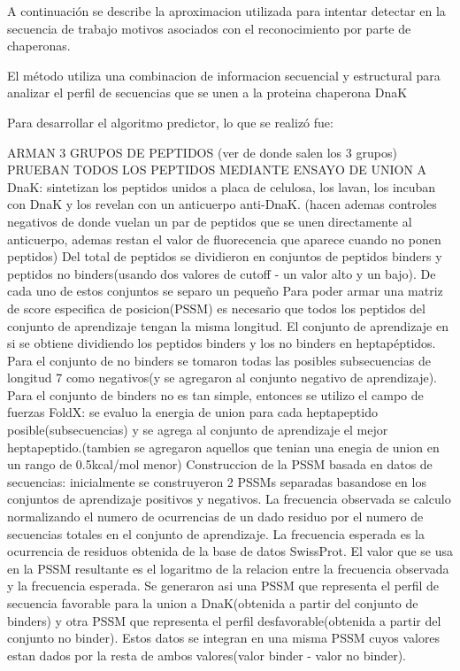 A continuación se describe la aproximacion utilizada para intentar detectar en la secuencia de trabajo motivos asociados con el reconocimiento por parte de chaperonas.

El método utiliza una combinacion de informacion secuencial y estructural para analizar el perfil de secuencias que se unen a la proteina chaperona DnaK

Para desarrollar el algoritmo predictor, lo que se realizó fue:

ARMAN 3 GRUPOS DE PEPTIDOS (ver de donde salen los 3 grupos)
PRUEBAN TODOS LOS PEPTIDOS MEDIANTE ENSAYO DE UNION A DnaK: sintetizan los peptidos unidos a placa de celulosa, los lavan, los incuban con DnaK y los revelan con un anticuerpo anti-DnaK. (hacen ademas controles negativos de donde vuelan un par de peptidos que se unen directamente al anticuerpo, ademas restan el valor de fluorecencia que aparece cuando no ponen peptidos)
Del total de peptidos se dividieron en conjuntos de peptidos binders y peptidos no binders(usando dos valores de cutoff - un valor alto y un bajo). De cada uno de estos conjuntos se separo un pequeño %
Para poder armar una matriz de score especifica de posicion(PSSM) es necesario que todos los peptidos del conjunto de aprendizaje tengan la misma longitud. El conjunto de aprendizaje en si se obtiene dividiendo los peptidos binders y los no binders en heptapéptidos. Para el conjunto de no binders se tomaron todas las posibles subsecuencias de longitud 7 como negativos(y se agregaron al conjunto negativo de aprendizaje). Para el conjunto de binders no es tan simple, entonces se utilizo el campo de fuerzas FoldX: se evaluo la energia de union para cada heptapeptido posible(subsecuencias) y se agrega al conjunto de aprendizaje el mejor heptapeptido.(tambien se agregaron aquellos que tenian una enegia de union en un rango de 0.5kcal/mol menor)
Construccion de la PSSM basada en datos de secuencias: inicialmente se construyeron 2 PSSMs separadas basandose en los conjuntos de aprendizaje positivos y negativos. La frecuencia observada se calculo normalizando el numero de ocurrencias de un dado residuo por el numero de secuencias totales en el conjunto de aprendizaje. La frecuencia esperada es la ocurrencia de residuos obtenida de la base de datos SwissProt. El valor que se usa en la PSSM resultante es el logaritmo de la relacion entre la frecuencia observada y la frecuencia esperada. Se generaron asi una PSSM que representa el perfil de secuencia favorable para la union a DnaK(obtenida a partir del conjunto de binders) y otra PSSM que representa el perfil desfavorable(obtenida a partir del conjunto no binder). Estos datos se integran en una misma PSSM cuyos valores estan dados por la resta de ambos valores(valor binder - valor no binder).
